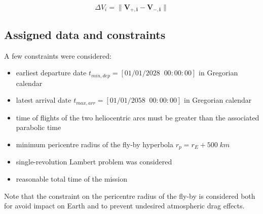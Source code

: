 \begin{equation}
    \Delta V_i= \lVert \boldsymbol{V_{+,i}} - \boldsymbol{V_{-,i}} \rVert
\end{equation}


\subsection{Assigned data and constraints}
\label{subsec:data_constraints}

A few constraints were considered:

\begin{itemize}
    [wide,itemsep=3pt,topsep=3pt]
    \item earliest departure date $t_{min,dep} = \left[01/01/2028 \;\; 00:00:00\right]$ in Gregorian calendar
    \item latest arrival date $t_{max,arr} = \left[01/01/2058 \;\; 00:00:00\right]$ in Gregorian calendar
    \item time of flights of the two heliocentric arcs must be greater than the associated parabolic time
    \item minimum pericentre radius of the fly-by hyperbola $r_p = r_E + 500 \; km$
    \item single-revolution Lambert problem was considered
    \item reasonable total time of the mission
\end{itemize}

Note that the constraint on the pericentre radius of the fly-by is considered both for avoid impact on Earth and to prevent undesired atmospheric drag effects.